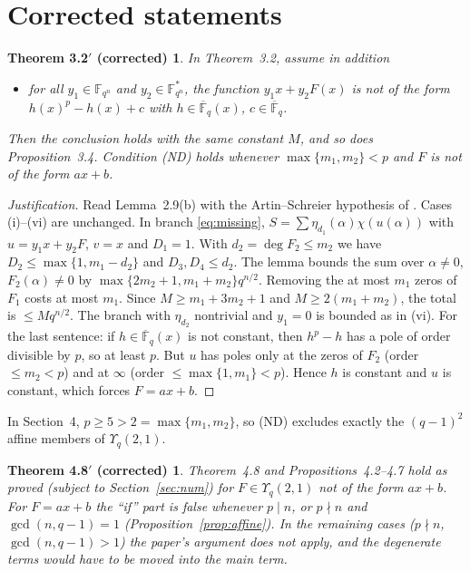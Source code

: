 \documentclass[11pt,a4paper]{amsart}
\newtheorem*{thmAc}{Theorem 3.2$'$ (corrected)}
\newtheorem*{thmBc}{Theorem 4.8$'$ (corrected)}
\theoremstyle{remark}
\newcommand{\F}{\mathbb{F}}
\newcommand{\Fqn}{\mathbb{F}_{q^n}}
\begin{document}
\section{Corrected statements}\label{sec:corr}

\begin{thmAc}
In Theorem~3.2, assume in addition
\begin{itemize}
\item[(ND)] for all $y_1\in\Fqn$ and $y_2\in\Fqn^*$, the function $y_1x+y_2F(x)$ is not of the form $h(x)^p-h(x)+c$ with
$h\in\overline{\F}_q(x)$, $c\in\overline{\F}_q$.
\end{itemize}
Then the conclusion holds with the same constant $M$, and so does Proposition~3.4. Condition (ND) holds whenever
$\max\{m_1,m_2\}<p$ and $F$ is not of the form $ax+b$.
\end{thmAc}
\begin{proof}[Justification]
Read Lemma~2.9(b) with the Artin--Schreier hypothesis of \cite{CM}. Cases (i)--(vi) are unchanged. In branch
\eqref{eq:missing}, $S=\sum\eta_{d_1}(\alpha)\chi(u(\alpha))$ with $u=y_1x+y_2F$, $v=x$ and $D_1=1$. With
$d_2=\deg F_2\le m_2$ we have $D_2\le\max\{1,m_1-d_2\}$ and $D_3,D_4\le d_2$. The lemma bounds the sum over
$\alpha\ne0$, $F_2(\alpha)\ne0$ by $\max\{2m_2+1,m_1+m_2\}q^{n/2}$. Removing the at most $m_1$ zeros of $F_1$ costs at
most $m_1$. Since $M\ge m_1+3m_2+1$ and $M\ge2(m_1+m_2)$, the total is $\le Mq^{n/2}$. The branch with $\eta_{d_2}$
nontrivial and $y_1=0$ is bounded as in (vi). For the last sentence: if $h\in\overline{\F}_q(x)$ is not constant,
then $h^p-h$ has a pole of order divisible by $p$, so at least $p$. But $u$ has poles only at the zeros of $F_2$ (order
$\le m_2<p$) and at $\infty$ (order $\le\max\{1,m_1\}<p$). Hence $h$ is constant and $u$ is constant, which forces
$F=ax+b$.
\end{proof}

In Section~4, $p\ge5>2=\max\{m_1,m_2\}$, so (ND) excludes exactly the $(q-1)^2$ affine members of $\Upsilon_q(2,1)$.

\begin{thmBc}
Theorem~4.8 and Propositions~4.2--4.7 hold as proved (subject to Section~\ref{sec:num}) for $F\in\Upsilon_q(2,1)$
not of the form $ax+b$. For $F=ax+b$ the ``if'' part is false whenever $p\mid n$, or $p\nmid n$ and $\gcd(n,q-1)=1$
(Proposition~\ref{prop:affine}). In the remaining cases ($p\nmid n$, $\gcd(n,q-1)>1$) the paper's argument does not
apply, and the degenerate terms would have to be moved into the main term.
\end{thmBc}
\end{document}
